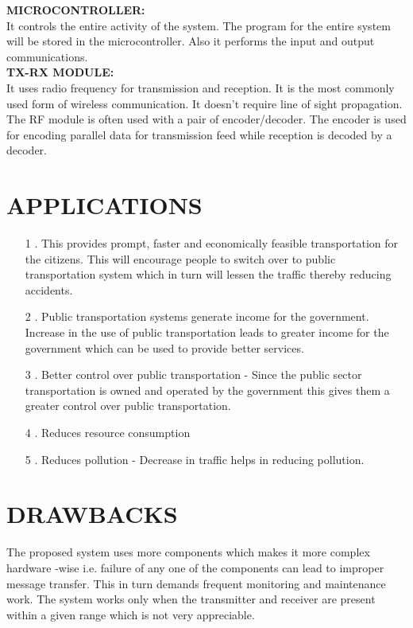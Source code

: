 \documentclass[12pt,a4paper,oneside]{report}
\begin{document}
\begin{onehalfspacing}
\textbf{MICROCONTROLLER:}\\
 It controls the entire activity of the system. The program for the entire system will be stored in the microcontroller. Also it performs the input and output communications. \\
 
\textbf{TX-RX  MODULE:}\\
It uses radio frequency for transmission and reception. It is the most commonly used form of wireless communication. It doesn't require line of sight propagation. The RF module is often used with a pair of encoder/decoder. The encoder is used for encoding parallel data for transmission feed while reception is decoded by a decoder.  \\


\newpage
\section{APPLICATIONS}
\par
\hspace{.7cm}
\begin{enumerate}	
\item[1]. This provides prompt, faster and economically feasible transportation for the citizens. This will encourage people to switch over to public transportation system which in turn will lessen the traffic thereby reducing accidents.
\item[2]. Public transportation systems generate income for the government. Increase in the use of public transportation leads to greater income for the government which can be used to provide better services.
\item[3]. Better control over public transportation - Since the public sector transportation is owned and operated by the government this gives them a greater control over public transportation.
\item[4]. Reduces resource consumption
\item[5]. Reduces pollution - Decrease in traffic helps in reducing pollution.
\end{enumerate}

\section{DRAWBACKS}
\par
\hspace{.7cm}
 The proposed system uses more components which makes it more complex hardware -wise i.e. failure of any one of the components can lead to improper message transfer. This in turn demands frequent monitoring and maintenance work.
The system works only when the transmitter and receiver are present within a given range which is not very appreciable.







\end{onehalfspacing}
\end{document}
